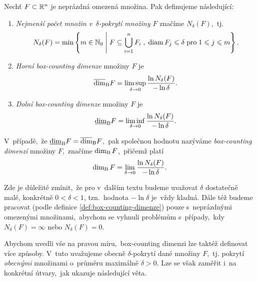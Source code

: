 \begin{definition}\label{def:box-counting-dimenze}
    Nechť $F\subset \mathbb{R}^n$ je neprázdná omezená množina. Pak definujeme následující:
    \begin{enumerate}[label=(\alph*)]
        \item \emph{Nejmenší počet množin v~$\delta$-pokrytí množiny $F$} značíme $N_\delta(F)$,~tj.
        \[N_\delta(F)=\min\left\{m\in\mathbb{N}_0\;\middle|\;F\subseteq\bigcup_{i=1}^n F_i\;,\;\operatorname{diam}{F_j}\leqslant\delta\;\text{pro}\;1\leqslant j\leqslant m\right\}.\]
        \item \emph{Horní box-counting dimenze} množiny $F$ je
        \[\overline{\dim}_\textup{B}{F}=\limsup_{\delta\to 0}\dfrac{\ln{N_\delta(F)}}{-\ln{\delta}}.\]
        \item \emph{Dolní box-counting dimenze} množiny $F$ je
        \[\underline{\dim}_\textup{B}{F}=\liminf_{\delta\to 0}\dfrac{\ln{N_\delta(F)}}{-\ln{\delta}}.\]
    \end{enumerate}
    V~případě,~že $\underline{\dim}_\textup{B}{F}=\overline{\dim}_\textup{B}{F}$,~pak společnou hodnotu nazýváme \emph{box-counting dimenzí} množiny $F$,~značíme $\operatorname{dim_B}{F}$,~přičemž platí
    \[\operatorname{dim_B}{F}=\lim_{\delta\to 0}\dfrac{\ln{N_\delta(F)}}{-\ln{\delta}}.\]
\end{definition}
\begin{remark}
    Zde je důležité zmínit,~že pro v~dalším textu budeme uvažovat $\delta$ dostatečně malé, konkrétně $0<\delta<1$, tzn.~hodnota $-\ln{\delta}$ je~vždy kladná. Dále též budeme pracovat (podle definice \ref{def:box-counting-dimenze}) pouze s~neprázdnými omezenými množinami,~abychom se vyhnuli problémům s~případy,~kdy $N_\delta(F)=\infty$ nebo $N_\delta(F)=0$.
\end{remark}
Abychom uvedli vše na pravou míru,~box-counting dimenzi lze taktéž definovat více způsoby. V~tuto uvažujeme obecně $\delta$-pokrytí dané množiny $F$,~tj. pokrytí \emph{obecnými} množinami o~průměru maximálně $\delta>0$. Lze se však zaměřit i~na konkrétní útvary,~jak ukazuje následující věta.
